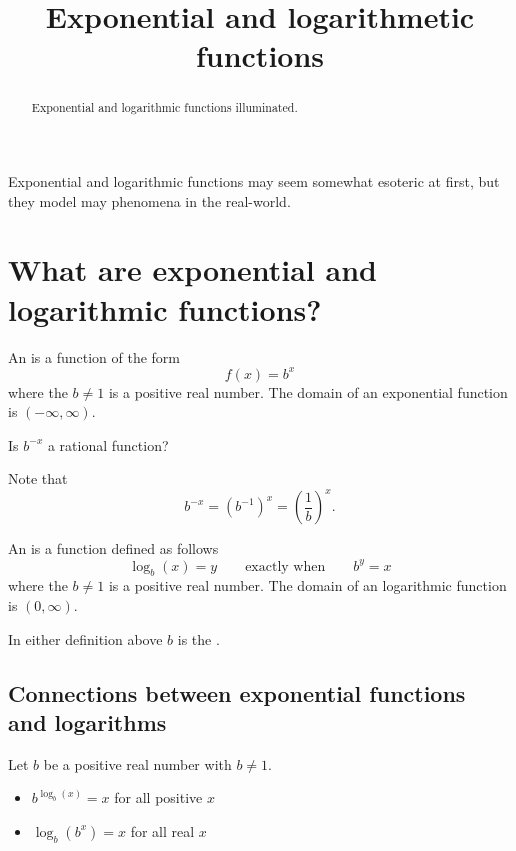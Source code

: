 \documentclass{ximera}
\title[Dig-In:]{Exponential and logarithmetic functions}
\begin{document}
\begin{abstract}
  Exponential and logarithmic functions illuminated.
\end{abstract}
\maketitle

Exponential and logarithmic functions may seem somewhat esoteric at
first, but they model may phenomena in the real-world.




\section{What are exponential and logarithmic functions?}


\begin{definition}
  An  is a function of the form
  \[
  f(x) = b^x
  \]
  where the $b\ne 1$ is a positive real number. The domain of an
  exponential function is $(-\infty,\infty)$.
\end{definition}

\begin{question}
  Is $b^{-x}$ a rational function?
  \begin{multipleChoice}
  \end{multipleChoice}
  \begin{feedback}
    Note that
    \[
    b^{-x} = \left(b^{-1}\right)^x = \left(\frac{1}{b}\right)^x.
    \]
  \end{feedback}
\end{question}



\begin{definition}
  An  is a function defined as follows
  \[
  \log_b(x) = y \qquad\text{exactly when}\qquad b^y = x
  \]
  where the $b\ne 1$ is a positive real number. The domain of an
  logarithmic function is $(0,\infty)$.
\end{definition}

In either definition above $b$ is the .

\subsection{Connections between exponential functions and logarithms}

Let $b$ be a positive real number with $b\ne 1$.
\begin{itemize}
\item $b^{\log_b(x)} = x$ for all positive $x$
\item $\log_b(b^x) = x$ for all real $x$
\end{itemize}
\end{document}
